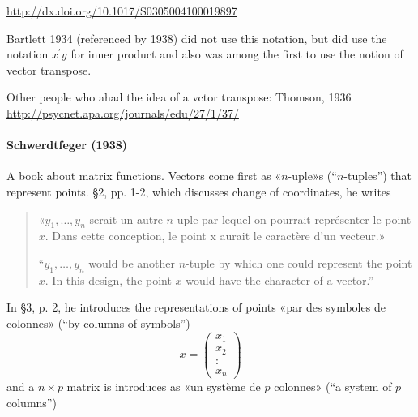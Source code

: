 \url{http://dx.doi.org/10.1017/S0305004100019897}

Bartlett 1934 (referenced by 1938) did not use this notation, but did use the notation $x^\prime y$ for inner product
and also was among the first to use the notion of vector transpose.

Other people who ahad the idea of a vctor transpose:
Thomson, 1936
\url{http://psycnet.apa.org/journals/edu/27/1/37/}



\paragraph{Schwerdtfeger (1938)~\cite{Schwerdtfeger1938}}

A book about matrix functions.
Vectors come first as «$n$-uple»s (``$n$-tuples'') that represent points. \S 2, pp. 1-2, which discusses change of coordinates, he writes
\begin{quote}
«$y_1, \dots, y_n$ serait un autre $n$-uple par lequel on pourrait représenter le point $x$. Dans cette conception, le point x aurait le caractère d'un vecteur.»

``$y_1, \dots, y_n$ would be another $n$-tuple by which one could represent the point $x$. In this design, the point $x$ would have the character of a vector.''
\end{quote}

In \S 3, p. 2, he introduces the representations of points «par des symboles de colonnes» (``by columns of symbols'')
\[
x =\begin{pmatrix}x_1\\x_2\\:\\x_n\end{pmatrix}
\]
and a $n \times p$ matrix is introduces as «un système de $p$ colonnes» (``a system of $p$ columns'')

